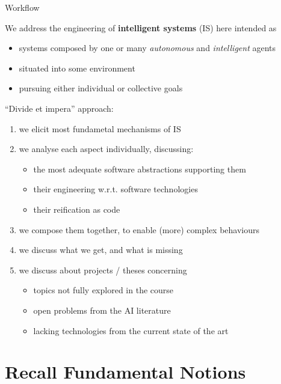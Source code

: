 \documentclass[presentation]{beamer}\mode<presentation>{\usetheme{AMSBolognaFC}}
\begin{document}
\begin{frame}[c,allowframebreaks]{Workflow}

\begin{block}{We address the engineering of \textbf{intelligent systems} (IS)}
	here intended as
	\begin{itemize}
		\item systems composed by one or many \emph{autonomous} and \emph{intelligent} \alert{agents}
		\item situated into some \alert{environment}
		\item pursuing either individual or collective \alert{goals}
	\end{itemize}
\end{block}

\framebreak

``Divide et impera'' approach:
%
\begin{enumerate}
	\item we elicit most fundametal mechanisms of IS
	\item we analyse each aspect individually, discussing:
	\begin{itemize}
		\item the most adequate software \alert{abstractions} supporting them
		\item their engineering w.r.t. software \alert{technologies}
		\item their reification as \alert{code}
	\end{itemize}
	\item we compose them together, to enable (more) complex behaviours
	\item we discuss what we get, and what is missing
	\item we discuss about projects / theses concerning
	\begin{itemize}
		\item topics not fully explored in the course
		\item open problems from the AI literature
		\item lacking technologies from the current state of the art
	\end{itemize}
\end{enumerate}

\end{frame}

\section{Recall Fundamental Notions}
\end{document}
